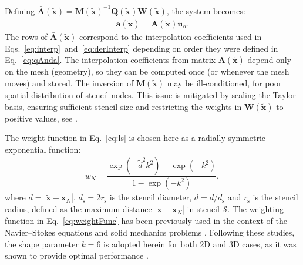 \documentclass[review,3p]{elsarticle}
\newcommand{\bb}{\boldsymbol}
\begin{document}
Defining $\bar{\mathbf{A}}(\tilde{\bb{x}})=\mathbf{M}(\tilde{\bb{x}})^{-1}\mathbf{Q}(\tilde{\bb{x}})\mathbf{W}(\tilde{\bb{x}})$, the system becomes:
%
\begin{eqnarray}\label{eq:lsA}
	\mathbf{\bar{a}}(\tilde{\bb{x}}) = \mathbf{\bar{A}}(\tilde{\bb{x}})\mathbf{u}_\alpha.
\end{eqnarray}
%
The rows of $\bar{\mathbf{A}}(\tilde{\boldsymbol{x}})$ correspond to the interpolation coefficients used in
Eqs.~\eqref{eq:interp}~and~\eqref{eq:derInterp} depending on order they were defined in Eq.~\eqref{eq:qAnda}.
The interpolation coefficients from matrix $\bar{\mathbf{A}}(\tilde{\boldsymbol{x}})$ depend only on the mesh (geometry), so they can be computed once (or whenever the mesh moves) and stored.
The inversion of ${\mathbf{M}}(\tilde{\boldsymbol{x}})$ may be ill-conditioned, for poor spatial distribution of stencil nodes.
This issue is mitigated by scaling the Taylor basis, ensuring sufficient stencil size and restricting the weights in $\mathbf{W}(\tilde{\boldsymbol{x}})$ to positive values, see \cite{Castrillo2022, Castrillo2023}.
%

%
The weight function in Eq.~\eqref{eq:ls} is chosen here as a radially symmetric exponential function:
\begin{eqnarray}\label{eq:weightFunc}
	w_N = \dfrac{\exp\left( -\tilde{d}^2k^2\right) -\exp\left(-k^2\right)}{1-\exp\left(-k^2\right)},
\end{eqnarray}
where $d=|\bb{\tilde{x}}-\bb{x}_N|$, $d_{\mathrm{s}}=2r_{\mathrm{s}}$ is the stencil diameter, $\tilde{d}=d/d_{\mathrm{s}}$ and $r_{\mathrm{s}}$ is the stencil radius, defined as the maximum distance $|\bb{\tilde{x}}-\bb{x}_N|$ in stencil $\mathcal{S}$. The weighting function in Eq.~\eqref{eq:weightFunc} has been previously used in the context of the Navier–Stokes equations
\cite{Ramirez2014, Khelladi2011} and solid mechanics problems \cite{Castrillo2022, Castrillo2024, Castrillo2023}.
Following these studies, the shape parameter $k = 6$ is adopted herein for both 2D and 3D cases, as it was shown to provide optimal performance \cite{Castrillo2022, Castrillo2024, Castrillo2023}.
%
\end{document}
